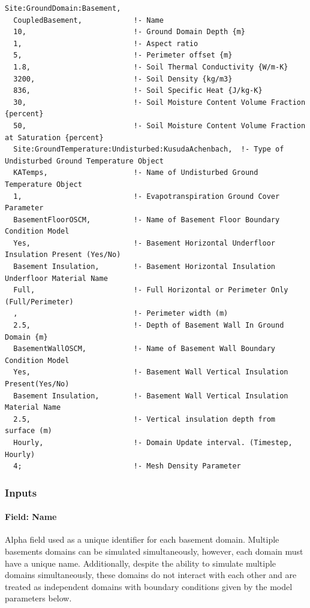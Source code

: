 \begin{lstlisting}
Site:GroundDomain:Basement,
  CoupledBasement,            !- Name
  10,                         !- Ground Domain Depth {m}
  1,                          !- Aspect ratio
  5,                          !- Perimeter offset {m}
  1.8,                        !- Soil Thermal Conductivity {W/m-K}
  3200,                       !- Soil Density {kg/m3}
  836,                        !- Soil Specific Heat {J/kg-K}
  30,                         !- Soil Moisture Content Volume Fraction {percent}
  50,                         !- Soil Moisture Content Volume Fraction at Saturation {percent}
  Site:GroundTemperature:Undisturbed:KusudaAchenbach,  !- Type of Undisturbed Ground Temperature Object
  KATemps,                    !- Name of Undisturbed Ground Temperature Object
  1,                          !- Evapotranspiration Ground Cover Parameter
  BasementFloorOSCM,          !- Name of Basement Floor Boundary Condition Model
  Yes,                        !- Basement Horizontal Underfloor Insulation Present (Yes/No)
  Basement Insulation,        !- Basement Horizontal Insulation Underfloor Material Name
  Full,                       !- Full Horizontal or Perimeter Only (Full/Perimeter)
  ,                           !- Perimeter width (m)
  2.5,                        !- Depth of Basement Wall In Ground Domain {m}
  BasementWallOSCM,           !- Name of Basement Wall Boundary Condition Model
  Yes,                        !- Basement Wall Vertical Insulation Present(Yes/No)
  Basement Insulation,        !- Basement Wall Vertical Insulation Material Name
  2.5,                        !- Vertical insulation depth from surface (m)
  Hourly,                     !- Domain Update interval. (Timestep, Hourly)
  4;                          !- Mesh Density Parameter
\end{lstlisting}

\subsubsection{Inputs}\label{inputs-17-004}

\paragraph{Field: Name}\label{field-name-9-009}

Alpha field used as a unique identifier for each basement domain. Multiple basements domains can be simulated simultaneously, however, each domain must have a unique name. Additionally, despite the ability to simulate multiple domains simultaneously, these domains do not interact with each other and are treated as independent domains with boundary conditions given by the model parameters below.

